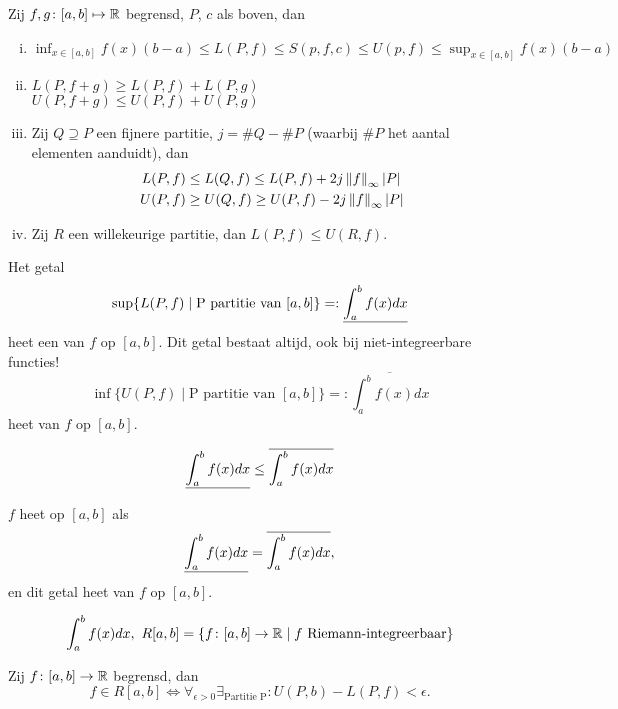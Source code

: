 \documentclass{2wa40summary}
\begin{document}
			\begin{lemma}
				Zij $ f,g\colon [a,b] \mapsto \mathbb{R} $ begrensd, $P$, $c$ als boven, dan
				\begin{enumerate}[(i)]
					\item $\displaystyle \inf_{x\in [a,b]} f(x) (b-a) \le L(P,f) \le S(p,f,c) \le U(p,f) \le \sup_{x \in [a,b]} f(x) (b-a) $
					\item $L(P,f+g) \ge L(P,f) + L(P,g)$ \\
					$U(P,f+g) \le U(P,f) + U(P,g)$
					\item Zij $Q \supseteq P$ een fijnere partitie, $ j = \#Q -\#P $ (waarbij $\#P$ het aantal elementen aanduidt), dan 
					\[ 
						\begin{split}
							L(P,f) &\le L(Q,f) \le L(P,f) + 2j \left\|f\right\|_\infty {\left|P\right|} \\
							U(P,f) &\ge U(Q,f) \ge U(P,f) - 2j \left\|f\right\|_\infty {\left|P\right|}
						\end{split}
					 \]
					 \item Zij $R$ een willekeurige partitie, dan $ L(P,f) \le U(R,f). $
				\end{enumerate}
			\end{lemma}
			\begin{define}
				 Het getal \[ \sup \{ L(P,f) \mid \text{P partitie van }[a,b] \} =: \underline{\int_{a}^{b} f(x) dx} \]
				 heet een  van $f$ op $[a,b]$.
				 \opm Dit getal bestaat altijd, ook bij niet-integreerbare functies!
				 \[ 
					 \inf \{ U(P,f) \mid \text{P partitie van }[a,b] \} =: \overline{\int_{a}^{b} f(x) dx}
				  \]
				  heet  van $f$ op $[a,b]$.
			\end{define}
			\begin{gevolg}
				\[ \underline{\int_{a}^{b} f(x) dx} \le \overline{\int_{a}^{b} f(x) dx} \]
			\end{gevolg}
			\begin{define}
				$f$ heet  op $[a,b]$ als 
				\[ \underline{\int_{a}^{b} f(x) dx} = \overline{\int_{a}^{b} f(x) dx}, \]
				en dit getal heet  van $f$ op $[a,b]$.
				\begin{nota}
					\[
					\int_{a}^{b} f(x) dx,\ R[a,b] = \{ f\colon [a,b]\to \mathbb{R} \mid f \text{ Riemann-integreerbaar} \}
					\]
				\end{nota}
			\end{define}
			
			\begin{theorem}
				Zij $ f\colon [a,b] \to \mathbb{R} $ begrensd, dan
				\[ 
					f \in R[a,b] \iff \forall_{\epsilon >0} \exists_{\text{Partitie P}}: U(P,b) - L(P,f) < \epsilon.
				 \]
			\end{theorem}
			
\end{document}
